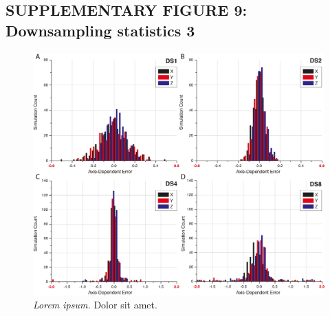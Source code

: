 \documentclass[]{spie}  %
\begin{document}
\subsection*{SUPPLEMENTARY FIGURE 9: Downsampling statistics 3}
\vspace{1mm}
\begin{figure}[h!]
\includegraphics[width=\textwidth]{fig-downsampling-statistics-2.png}
\vspace{-2.0mm}
\caption{\hspace{-0.5mm} \emph{Lorem ipsum.} Dolor sit amet.
}
\label{fig:sup-fig-downsampling-statistics-2}
\end{figure}

\pagebreak
\end{document}
